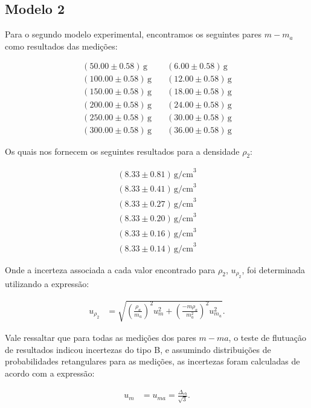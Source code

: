 \documentclass{article}
\begin{document}
\begin{multicols}{2}
\subsection{Modelo 2}

Para o segundo modelo experimental, encontramos os seguintes pares $m-m_a$ como resultados das medições:

\begin{align*}
(50.00 \pm 0.58) \, \text{g} & \quad (6.00 \pm 0.58) \, \text{g} \\
(100.00 \pm 0.58) \, \text{g} & \quad (12.00 \pm 0.58) \, \text{g} \\
(150.00 \pm 0.58) \, \text{g} & \quad (18.00 \pm 0.58) \, \text{g} \\
(200.00 \pm 0.58) \, \text{g} & \quad (24.00 \pm 0.58) \, \text{g} \\
(250.00 \pm 0.58) \, \text{g} & \quad (30.00 \pm 0.58) \, \text{g} \\
(300.00 \pm 0.58) \, \text{g} & \quad (36.00 \pm 0.58) \, \text{g}
\end{align*}

Os quais nos fornecem os seguintes resultados para a densidade $\rho_2$:

\begin{align*}
(8.33 \pm 0.81) \, \text{g/cm}^3 \\
(8.33 \pm 0.41) \, \text{g/cm}^3 \\
(8.33 \pm 0.27) \, \text{g/cm}^3 \\
(8.33 \pm 0.20) \, \text{g/cm}^3 \\
(8.33 \pm 0.16) \, \text{g/cm}^3 \\
(8.33 \pm 0.14) \, \text{g/cm}^3
\end{align*}

Onde a incerteza associada a cada valor encontrado para $\rho_2$, $u_{\rho_2}$, foi determinada utilizando a expressão:

\begin{align}
u_{\rho_2} &= \sqrt{\left(\frac{\rho_a}{m_a}\right)^2 u^2_m + \left(\frac{-m\rho_a}{m^2_a}\right)^2 u^2_{m_a}}.
\end{align}

Vale ressaltar que para todas as medições dos pares $m-ma$, o teste de flutuação de resultados indicou incertezas do tipo B, e assumindo distribuições de probabilidades retangulares para as medições, as incertezas foram calculadas de acordo com a expressão:

\begin{align}
u_m &= u_{ma} = \frac{\Delta_{rb}}{\sqrt{3}}.
\end{align}


\end{multicols}
\end{document}
